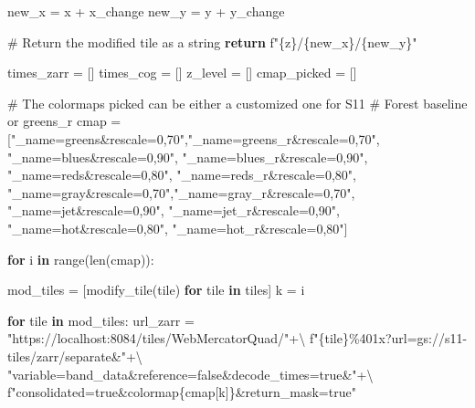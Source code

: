 \documentclass[
  oneside,
  open=any]{scrbook}
\newenvironment{Shaded}{\begin{snugshade}}{\end{snugshade}}
\newcommand{\BuiltInTok}[1]{\textcolor[rgb]{0.00,0.23,0.31}{#1}}
\newcommand{\CommentTok}[1]{\textcolor[rgb]{0.37,0.37,0.37}{#1}}
\newcommand{\ControlFlowTok}[1]{\textcolor[rgb]{0.00,0.23,0.31}{\textbf{#1}}}
\newcommand{\KeywordTok}[1]{\textcolor[rgb]{0.00,0.23,0.31}{\textbf{#1}}}
\newcommand{\NormalTok}[1]{\textcolor[rgb]{0.00,0.23,0.31}{#1}}
\newcommand{\OperatorTok}[1]{\textcolor[rgb]{0.37,0.37,0.37}{#1}}
\newcommand{\SpecialCharTok}[1]{\textcolor[rgb]{0.37,0.37,0.37}{#1}}
\newcommand{\SpecialStringTok}[1]{\textcolor[rgb]{0.13,0.47,0.30}{#1}}
\newcommand{\StringTok}[1]{\textcolor[rgb]{0.13,0.47,0.30}{#1}}
\begin{document}
\begin{Shaded}
\begin{Highlighting}[]
\NormalTok{    new\_x }\OperatorTok{=}\NormalTok{ x }\OperatorTok{+}\NormalTok{ x\_change}
\NormalTok{    new\_y }\OperatorTok{=}\NormalTok{ y }\OperatorTok{+}\NormalTok{ y\_change}

    \CommentTok{\# Return the modified tile as a string}
    \ControlFlowTok{return} \SpecialStringTok{f"}\SpecialCharTok{\{}\NormalTok{z}\SpecialCharTok{\}}\SpecialStringTok{/}\SpecialCharTok{\{}\NormalTok{new\_x}\SpecialCharTok{\}}\SpecialStringTok{/}\SpecialCharTok{\{}\NormalTok{new\_y}\SpecialCharTok{\}}\SpecialStringTok{"}

\NormalTok{times\_zarr }\OperatorTok{=}\NormalTok{ []}
\NormalTok{times\_cog }\OperatorTok{=}\NormalTok{ []}
\NormalTok{z\_level }\OperatorTok{=}\NormalTok{ []}
\NormalTok{cmap\_picked }\OperatorTok{=}\NormalTok{ []}

\CommentTok{\# The colormaps picked can be either a customized one for S11}
\CommentTok{\# Forest baseline or greens\_r}
\NormalTok{cmap }\OperatorTok{=}\NormalTok{ [}\StringTok{"\_name=greens\&rescale=0,70"}\NormalTok{,}\StringTok{"\_name=greens\_r\&rescale=0,70"}\NormalTok{,}
        \StringTok{"\_name=blues\&rescale=0,90"}\NormalTok{, }\StringTok{"\_name=blues\_r\&rescale=0,90"}\NormalTok{,}
        \StringTok{"\_name=reds\&rescale=0,80"}\NormalTok{, }\StringTok{"\_name=reds\_r\&rescale=0,80"}\NormalTok{,}
        \StringTok{"\_name=gray\&rescale=0,70"}\NormalTok{,}\StringTok{"\_name=gray\_r\&rescale=0,70"}\NormalTok{,}
        \StringTok{"\_name=jet\&rescale=0,90"}\NormalTok{, }\StringTok{"\_name=jet\_r\&rescale=0,90"}\NormalTok{,}
        \StringTok{"\_name=hot\&rescale=0,80"}\NormalTok{, }\StringTok{"\_name=hot\_r\&rescale=0,80"}\NormalTok{]}

\ControlFlowTok{for}\NormalTok{ i }\KeywordTok{in} \BuiltInTok{range}\NormalTok{(}\BuiltInTok{len}\NormalTok{(cmap)):}

\NormalTok{    mod\_tiles }\OperatorTok{=}\NormalTok{ [modify\_tile(tile) }\ControlFlowTok{for}\NormalTok{ tile }\KeywordTok{in}\NormalTok{ tiles]}
\NormalTok{    k }\OperatorTok{=}\NormalTok{ i}

    \ControlFlowTok{for}\NormalTok{ tile }\KeywordTok{in}\NormalTok{ mod\_tiles:}
\NormalTok{        url\_zarr }\OperatorTok{=} \StringTok{"https://localhost:8084/tiles/WebMercatorQuad/"}\OperatorTok{+\textbackslash{}}
        \SpecialStringTok{f"}\SpecialCharTok{\{}\NormalTok{tile}\SpecialCharTok{\}}\SpecialStringTok{\%401x?url=gs://s11{-}tiles/zarr/separate\&"}\OperatorTok{+\textbackslash{}}
        \StringTok{"variable=band\_data\&reference=false\&decode\_times=true\&"}\OperatorTok{+\textbackslash{}}
        \SpecialStringTok{f"consolidated=true\&colormap}\SpecialCharTok{\{}\NormalTok{cmap[k]}\SpecialCharTok{\}}\SpecialStringTok{\&return\_mask=true"}


\end{Highlighting}
\end{Shaded}
\end{document}
